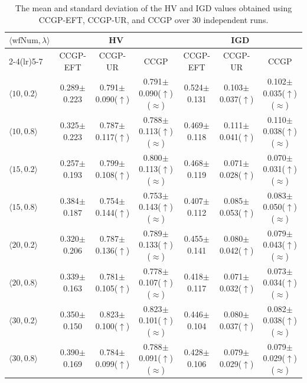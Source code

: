 \documentclass[10pt,journal]{IEEEtran}
\begin{document}
\begin{table}[!t]
\caption{The mean and standard deviation of the HV and IGD values obtained using CCGP-EFT, CCGP-UR, and CCGP over 30 independent runs.}
\label{Table: combined GP task sequencing}
\centering
\setlength{\tabcolsep}{1.8pt}
\resizebox{\linewidth}{!}
{\begin{tabular}{@{}lcccccc@{}}
\toprule
\multirow{2}{*}{$\langle\mathrm{wfNum},\lambda\rangle$}
& \multicolumn{3}{c}{HV} & \multicolumn{3}{c}{IGD} \\
\cmidrule(lr){2-4}\cmidrule(lr){5-7}
& CCGP-EFT & CCGP-UR & CCGP & CCGP-EFT & CCGP-UR & CCGP \\
\midrule
$\langle10,0.2\rangle$ & 0.289$\pm$0.223 & 0.791$\pm$0.090($\uparrow$) & 0.791$\pm$0.090($\uparrow$)($\approx$) & 0.524$\pm$0.131 & 0.103$\pm$0.037($\uparrow$) & 0.102$\pm$0.035($\uparrow$)($\approx$) \\
$\langle10,0.8\rangle$ & 0.325$\pm$0.223 & 0.787$\pm$0.117($\uparrow$) & 0.788$\pm$0.113($\uparrow$)($\approx$) & 0.469$\pm$0.118 & 0.111$\pm$0.041($\uparrow$) & 0.110$\pm$0.038($\uparrow$)($\approx$) \\
$\langle15,0.2\rangle$ & 0.257$\pm$0.193 & 0.799$\pm$0.108($\uparrow$) & 0.800$\pm$0.113($\uparrow$)($\approx$) & 0.468$\pm$0.119 & 0.071$\pm$0.028($\uparrow$) & 0.070$\pm$0.031($\uparrow$)($\approx$) \\
$\langle15,0.8\rangle$ & 0.384$\pm$0.187 & 0.754$\pm$0.144($\uparrow$) & 0.753$\pm$0.143($\uparrow$)($\approx$) & 0.407$\pm$0.112 & 0.085$\pm$0.053($\uparrow$) & 0.083$\pm$0.050($\uparrow$)($\approx$) \\
$\langle20,0.2\rangle$ & 0.320$\pm$0.206 & 0.787$\pm$0.136($\uparrow$) & 0.789$\pm$0.133($\uparrow$)($\approx$) & 0.455$\pm$0.141 & 0.080$\pm$0.042($\uparrow$) & 0.079$\pm$0.043($\uparrow$)($\approx$) \\
$\langle20,0.8\rangle$ & 0.339$\pm$0.163 & 0.781$\pm$0.105($\uparrow$) & 0.778$\pm$0.107($\uparrow$)($\approx$) & 0.418$\pm$0.117 & 0.071$\pm$0.032($\uparrow$) & 0.073$\pm$0.034($\uparrow$)($\approx$) \\
$\langle30,0.2\rangle$ & 0.350$\pm$0.150 & 0.823$\pm$0.100($\uparrow$) & 0.823$\pm$0.101($\uparrow$)($\approx$) & 0.446$\pm$0.104 & 0.080$\pm$0.037($\uparrow$) & 0.082$\pm$0.038($\uparrow$)($\approx$) \\
$\langle30,0.8\rangle$ & 0.390$\pm$0.169 & 0.784$\pm$0.099($\uparrow$) & 0.788$\pm$0.091($\uparrow$)($\approx$) & 0.428$\pm$0.106 & 0.079$\pm$0.029($\uparrow$) & 0.079$\pm$0.029($\uparrow$)($\approx$) \\

\end{tabular}}
\end{table}
\end{document}
